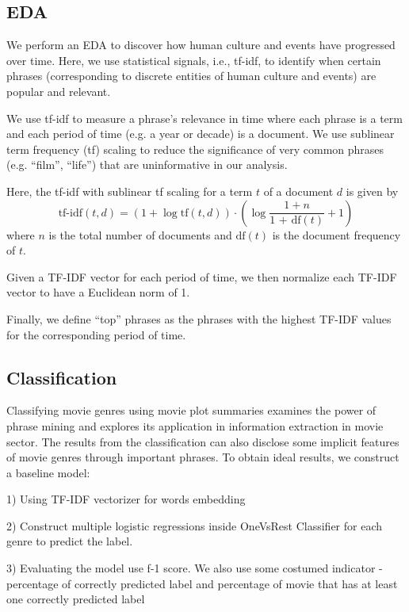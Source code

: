 \documentclass{article}
\begin{document}
\begin{multicols}{2}
\subsection{EDA}
We perform an EDA to discover how human culture and events have progressed over time. Here, we use statistical signals, i.e., tf-idf, to identify when certain phrases (corresponding to discrete entities of human culture and events) are popular and relevant.

We use tf-idf to measure a phrase's relevance in time where each phrase is a term and each period of time (e.g. a year or decade) is a document. We use sublinear term frequency (tf) scaling to reduce the significance of very common phrases (e.g. ``film'', ``life'') that are uninformative in our analysis.

Here, the tf-idf with sublinear tf scaling for a term $t$ of a document $d$ is given by
$$\text{tf-idf}(t, d) = (1 + \log\text{tf}(t, d)) \cdot \left(\log\frac{1 + n}{\text{1 + df}(t)} + 1\right)$$
where $n$ is the total number of documents and $\text{df}(t)$ is the document frequency of $t$.

Given a TF-IDF vector for each period of time, we then normalize each TF-IDF vector to have a Euclidean norm of 1.

Finally, we define ``top'' phrases as the phrases with the highest TF-IDF values for the corresponding period of time.


\subsection{Classification}
   Classifying movie genres using movie plot summaries examines the power of phrase mining and explores its application in information extraction in movie sector. The results from the classification can also disclose some implicit features of movie genres through important phrases. To obtain ideal results, we construct a baseline model: 
   
   1) Using TF-IDF vectorizer for words embedding
   
   2) Construct multiple logistic regressions inside OneVsRest Classifier for each genre to predict the label. 
   
   3) Evaluating the model use f-1 score. We also use some costumed indicator - percentage of correctly predicted label and percentage of movie that has at least one correctly predicted label
   
   

\end{multicols}
\end{document}
